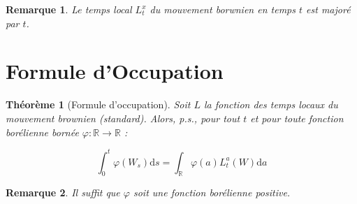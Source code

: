 \documentclass[openany]{book}
\newcommand{\R}{\mathbb{R}}
\newcommand{\1}{\mathbbm{1}}
\renewcommand{\d}{\mathrm{d}}
\theoremstyle{thmfont}
\newtheorem{theorem}{Théorème}[chapter]
\theoremstyle{deffont}
\theoremstyle{thmfont}
\theoremstyle{deffont}
\newtheorem{remark}[remark]{Remarque}
\begin{document}
  \begin{remark}
    Le temps local $L_t^x$ du mouvement borwnien en temps $t$ est majoré par $t$.
  \end{remark}
  


\section{Formule d'Occupation}

\begin{theorem}[Formule d'occupation]
\label{thm:occupation} Soit $L$ la fonction des temps locaux du mouvement brownien (standard). Alors, p.s., pour tout $t$ et pour toute fonction borélienne bornée $\varphi : \R \rightarrow \R$ :

\begin{equation}
  \int_0^t \varphi(W_s) \d s = \int_{\R}\varphi(a)L_t^a(W) \d a
  \label{eq:occupation}
\end{equation}

\end{theorem}

\begin{remark}
  Il suffit que $\varphi$ soit une fonction borélienne positive.
  \end{remark}
\end{document}

